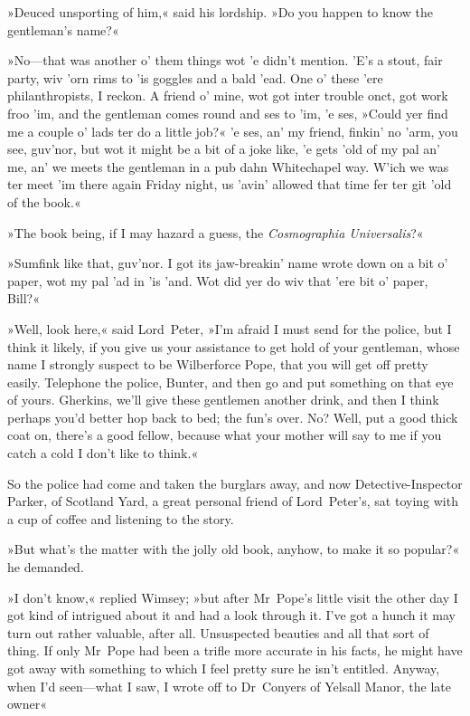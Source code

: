 »Deuced unsporting of him,« said his lordship. »Do you happen to know the gentleman's name?«

»No—that was another o' them things wot 'e didn't mention. 'E's a stout, fair party, wiv 'orn rims to 'is goggles and a bald 'ead. One o' these 'ere philanthropists, I reckon. A friend o' mine, wot got inter trouble onct, got work froo 'im, and the gentleman comes round and ses to 'im, 'e ses, »Could yer find me a couple o' lads ter do a little job?« 'e ses, an' my friend, finkin' no 'arm, you see, guv'nor, but wot it might be a bit of a joke like, 'e gets 'old of my pal an' me, an' we meets the gentleman in a pub dahn Whitechapel way. W'ich we was ter meet 'im there again Friday night, us 'avin' allowed that time fer ter git 'old of the book.«

»The book being, if I may hazard a guess, the \textit{Cosmographia Universalis}?«

»Sumfink like that, guv'nor. I got its jaw-breakin' name wrote down on a bit o' paper, wot my pal 'ad in 'is 'and. Wot did yer do wiv that 'ere bit o' paper, Bill?«

»Well, look here,« said Lord~Peter, »I'm afraid I must send for the police, but I think it likely, if you give us your assistance to get hold of your gentleman, whose name I strongly suspect to be Wilberforce Pope, that you will get off pretty easily. Telephone the police, Bunter, and then go and put something on that eye of yours. Gherkins, we'll give these gentlemen another drink, and then I think perhaps you'd better hop back to bed; the fun's over. No? Well, put a good thick coat on, there's a good fellow, because what your mother will say to me if you catch a cold I don't like to think.«

So the police had come and taken the burglars away, and now Detective-Inspector Parker, of Scotland Yard, a great personal friend of Lord~Peter's, sat toying with a cup of coffee and listening to the story.

»But what's the matter with the jolly old book, anyhow, to make it so popular?« he demanded.

»I don't know,« replied Wimsey; »but after Mr~Pope's little visit the other day I got kind of intrigued about it and had a look through it. I've got a hunch it may turn out rather valuable, after all. Unsuspected beauties and all that sort of thing. If only Mr~Pope had been a trifle more accurate in his facts, he might have got away with something to which I feel pretty sure he isn't entitled. Anyway, when I'd seen—what I saw, I wrote off to Dr~Conyers of Yelsall Manor, the late owner\longdash«

